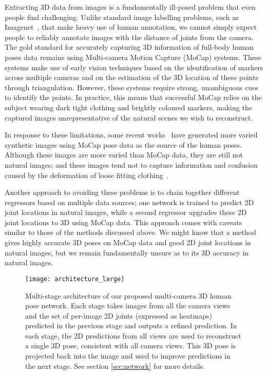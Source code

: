 \documentclass[10pt,twocolumn,letterpaper]{article}
\begin{document}
Extracting 3D data from images is a fundamentally ill-posed problem that even
people find challenging. Unlike standard image labelling problems, such as
Imagenet~\cite{deng2009imagenet}, that make heavy use of human annotation, we
cannot simply expect people to reliably annotate images with the distance of
joints from the camera. The gold standard for accurately capturing 3D
information of full-body human poses data remains using Multi-camera Motion Capture
(MoCap) systems. These systems make use of early vision techniques based on the
identification of markers across multiple cameras and on the estimation of the 3D
location of these points through triangulation. However, these systems require
strong, unambiguous cues to identify the points. In practice, this means that
successful MoCap relies on the subject wearing dark tight clothing and
brightly coloured markers, making the captured images unrepresentative of
the natural scenes we wish to reconstruct.

In response to these limitations, some recent
works~\cite{ionescu2014human3,rogez2016MoCap,varol2017learning} have generated
more varied synthetic images using MoCap pose data as the source of the human
poses. Although these images are more varied than MoCap data, they are still not
natural images; and these images tend not to capture information and confusion
caused by the deformation of loose fitting clothing~\cite{lassner2017generative}.



Another approach to avoiding these problems is to chain together different
regressors based on multiple data sources; one network is trained to
predict 2D joint locations in natural images, while a second regressor upgrades
these 2D joint locations to 3D using MoCap data. This approach comes with
caveats similar to those of the methods discussed above. We might know that a
method gives highly accurate 3D poses on MoCap data and good 2D joint locations
in natural images, but we remain fundamentally unsure as to its 3D accuracy in
natural images. 



\begin{figure*}[!ht]
  \begin{center}
    \texttt{[image: architecture\_large]}
  \end{center}
  \caption{Multi-stage architecture of our proposed multi-camera 3D
   human pose network. Each stage takes  images
   from all the camera views and the set of per-image 2D joints
   (expressed as heatmaps) predicted in the previous stage and outputs
   a refined prediction. In each stage, the 2D predictions from all
   views are used to reconstruct a single 3D pose, consistent with all
   camera views. This 3D pose is projected back into the image and used to
   improve predictions in the next stage. See section \ref{sec:network} for more
   details.\label{fig:architecture_stage}}
\end{figure*}
\end{document}
